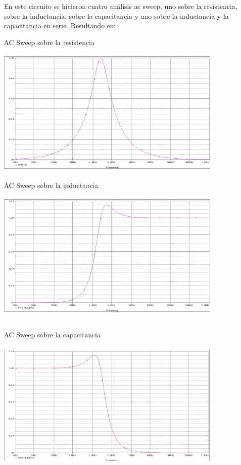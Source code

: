 \documentclass[12pt]{article}
\begin{document}
\begin{itemize}
		\noindent En este circuito se hicieron cuatro análisis ac sweep, uno sobre la resistencia, sobre la inductancia, sobre la capacitancia y uno sobre la inductancia y la capacitancia en serie. Resultando en:
		
		\newpage
		
		\noindent AC Sweep sobre la resistencia\\
		
		\includegraphics[width=11cm,height=7cm]{Img/Fuente_AC_RLC_AC_Sweep_Resistencia}\\
		
		\noindent AC Sweep sobre la inductancia\\
		
		\includegraphics[width=11cm,height=7cm]{Img/Fuente_AC_RLC_AC_Sweep_L}
		
		\newpage
		
		\noindent AC Sweep sobre la capacitancia\\
		
		\includegraphics[width=11cm,height=7cm]{Img/Fuente_AC_RLC_AC_Sweep_C}\\
		

\end{itemize}
\end{document}
